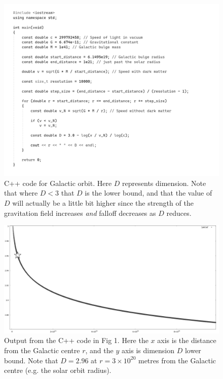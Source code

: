 \documentclass[12pt]{article}
\begin{document}
\pagebreak


\begin{figure} 
\centering
  \includegraphics[width = 6 in]{code.png}
  \caption{ C++ code for Galactic orbit. 
Here $D$ represents dimension.
Note that where $D < 3$ that $D$ is the lower bound, and that the value of $D$ will actually be a little bit higher since the strength of the gravitation field increases {\textit{and}} falloff decreases as $D$ reduces.
}
\end{figure}


\begin{figure} 
\centering
  \includegraphics[width = 5 in]{dimension_graph.png}
  \caption{ Output from the C++ code in Fig 1.
Here the $x$ axis is the distance from the Galactic centre $r$, and the $y$ axis is dimension $D$ lower bound.
Note that $D = 2.96$ at $r = 3 \times 10^{20}$ metres from the Galactic centre (e.g. the solar orbit radius).
}
\end{figure}
\end{document}
